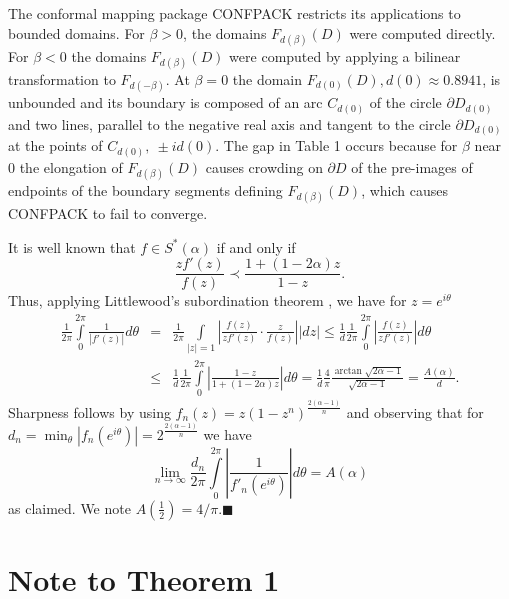 The conformal mapping package CONFPACK restricts its applications to
bounded domains.  For $\beta >0$, the domains $F_{d(\beta)}(D)$
were computed directly.  For $\beta<0$ the domains
$F_{d(\beta)}(D)$ were computed by applying a bilinear
transformation to $F_{d(-\beta)}$.  At $\beta=0$ the domain
$F_{d(0)}(D), d(0)\approx 0.8941$, is unbounded and its boundary is
composed of an arc $C_{d(0)}$ of the circle $\partial D_{d(0)}$ and two
lines, parallel to the negative real axis and tangent to the circle
$\partial D_{d(0)}$ at the points of $C_{d(0)}, \ \pm id(0)$. 
The gap in Table 1 occurs because for $\beta$ near $0$ the elongation
of $F_{d(\beta)}(D)$ causes crowding on $\partial D$ of the
pre-images of endpoints of the boundary segments defining
$F_{d(\beta)}(D)$, which causes CONFPACK to fail to converge.  
\vspace{12pt}

\vspace{12pt}

It is well known \cite{9} that $f\in S^\ast (\alpha)$ if and only if
\begin{equation}
\label{eq:18}
\frac{zf'(z)}{f(z)} \prec \frac{1+(1-2\alpha)z}{1-z} .
\end{equation}
Thus, applying Littlewood's subordination theorem \cite{6}, we have
for $z=e^{i\theta}$
\begin{eqnarray*}
\frac{1}{2\pi} \int\limits^{2\pi}_0 \frac{1}{|f'(z)|} d\theta
&=&\frac{1}{2\pi} \int\limits_{|z|=1} \left|\frac{f(z)}{zf'(z)} \cdot
\frac{z}{f(z)} \right| |dz| \leq \frac{1}{d} \frac{1}{2\pi}
\int\limits^{2\pi}_0 \left| \frac{f(z)}{zf'(z)}\right| d\theta\\[2ex]
&\leq& \frac{1}{d} \frac{1}{2\pi} \int\limits^{2\pi}_0 \left|
\frac{1-z}{1+(1-2\alpha)z} \right| d\theta =\frac{1}{d} \frac{4}{\pi}
\frac{\arctan \sqrt{2\alpha-1}}{\sqrt{2\alpha-1}}
=\frac{A(\alpha)}{d}.
\end{eqnarray*}
Sharpness follows by using $f_n(z)=z(1-z^n)^{\frac{2(\alpha-1)}{n}}$
and observing that for $d_n=\displaystyle{\min_\theta} |f_n (e^{i\theta})|
=2^{\frac{2(\alpha-1)}{n}}$ we have
$$\lim_{n\rightarrow \infty} \frac{d_n}{2\pi} \int\limits^{2\pi}_0
\left| \frac{1}{f'_n(e^{i\theta})} \right| d\theta =A(\alpha)$$
as claimed.  We note $A(\frac{1}{2}) =4/\pi$.\hfill $\blacksquare$

\section{Note to Theorem 1}


